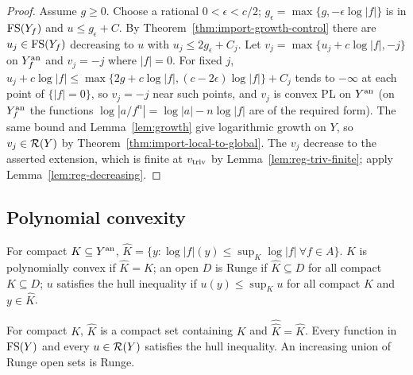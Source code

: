 \begin{proof}
Assume $g\ge0$. Choose a rational $0<\epsilon<c/2$; $g_\epsilon=\max\{g,-\epsilon\log|f|\}$ is in
$\mathrm{FS}(Y_f)$ and $u\le g_\epsilon+C$. By Theorem~\ref{thm:import-growth-control} there are
$u_j\in\mathrm{FS}(Y_f)$ decreasing to $u$ with $u_j\le2g_\epsilon+C_j$. Let $v_j=\max\{u_j+c\log|f|,-j\}$ on
$Y_f^{\mathrm{an}}$ and $v_j=-j$ where $|f|=0$. For fixed $j$,
$u_j+c\log|f|\le\max\{2g+c\log|f|,(c-2\epsilon)\log|f|\}+C_j$ tends to $-\infty$ at each point of
$\{|f|=0\}$, so $v_j=-j$ near such points, and $v_j$ is convex PL on $Y^{\mathrm{an}}$ (on $Y_f^{\mathrm{an}}$ the
functions $\log|a/f^n|=\log|a|-n\log|f|$ are of the required form). The same bound and
Lemma~\ref{lem:growth} give logarithmic growth on $Y$, so $v_j\in\mathcal{R}(Y)$ by
Theorem~\ref{thm:import-local-to-global}. The $v_j$ decrease to the asserted extension, which is
finite at $v_{\mathrm{triv}}$ by Lemma~\ref{lem:reg-triv-finite}; apply Lemma~\ref{lem:reg-decreasing}.
\end{proof}

\subsection{Polynomial convexity}\label{subsec:polyconvex}

\begin{definition}\label{def:hull}
\leanok
{}
For compact $K\subseteq Y^{\mathrm{an}}$, $\widehat K=\{y:\log|f|(y)\le\sup_K\log|f|\ \forall f\in A\}$. $K$ is
polynomially convex if $\widehat K=K$; an open $D$ is Runge if $\widehat K\subseteq D$ for all compact
$K\subseteq D$; $u$ satisfies the hull inequality if $u(y)\le\sup_Ku$ for all compact $K$ and
$y\in\widehat K$.
\end{definition}

\begin{lemma}\label{lem:hull-basic}
\leanok
{}
For compact $K$, $\widehat K$ is a compact set containing $K$ and $\widehat{\widehat K}=\widehat K$. Every
function in $\mathrm{FS}(Y)$ and every $u\in\mathcal{R}(Y)$ satisfies the hull inequality. An increasing union of
Runge open sets is Runge.
\end{lemma}

